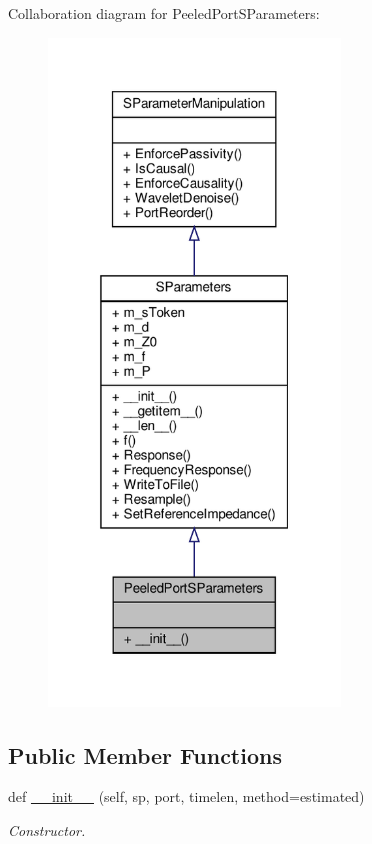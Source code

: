 Collaboration diagram for Peeled\+Port\+S\+Parameters\+:
\nopagebreak
\begin{figure}[H]
\begin{center}
\leavevmode
\includegraphics[width=220pt]{classSignalIntegrity_1_1ImpedanceProfile_1_1PeeledPortSParameters_1_1PeeledPortSParameters__coll__graph}
\end{center}
\end{figure}
\subsection*{Public Member Functions}
\begin{DoxyCompactItemize}
\item 
def \hyperlink{classSignalIntegrity_1_1ImpedanceProfile_1_1PeeledPortSParameters_1_1PeeledPortSParameters_a2f07334b8ebb7d96d8bbfbe1f5425e3b}{\+\_\+\+\_\+init\+\_\+\+\_\+} (self, sp, port, timelen, method=\textquotesingle{}estimated\textquotesingle{})
\begin{DoxyCompactList}\small\item\em Constructor. \end{DoxyCompactList}\end{DoxyCompactItemize}


